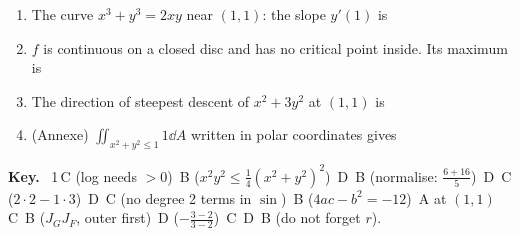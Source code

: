 \begin{enumerate}[label={\color{tealD}\sffamily\bfseries Q\arabic*.}, leftmargin=2.3em, itemsep=4pt]
\item The curve $x^3+y^3=2xy$ near $(1,1)$: the slope $y'(1)$ is
\item $f$ is continuous on a closed disc and has no critical point inside. Its maximum is
\item The direction of steepest descent of $x^2+3y^2$ at $(1,1)$ is
\item (Annexe) $\iint_{x^2+y^2\le1}1\dd A$ written in polar coordinates gives
\end{enumerate}

\begin{remember}
\textbf{Key.} \
1\,C (log needs $>0$) \,B ($x^2y^2\le\frac14(x^2+y^2)^2$) \,D \,B (normalise: $\frac{6+16}5$) \,D \,C ($2\cdot2-1\cdot3$) \,D \,C (no degree 2 terms in $\sin$) \,B ($4ac-b^2=-12$) \,A at $(1,1)$ \,C \,B ($J_GJ_F$, outer first) \,D ($-\frac{3-2}{3-2}$) \,C \,D \,B (do not forget $r$).
\end{remember}
